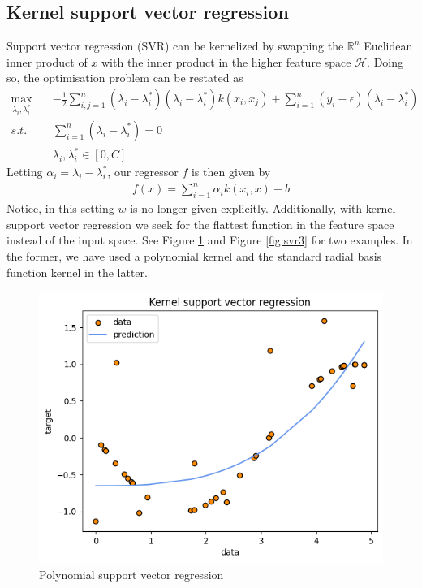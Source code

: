 \subsection{Kernel support vector regression}
Support vector regression (SVR) can be kernelized by swapping the $\mathbb{R}^n$ Euclidean inner product of $x$ with the inner product in the higher feature space $\mathcal{H}$. Doing so, the optimisation problem can be restated as
\begin{equation}
    \begin{aligned}
        \max_{\lambda_i, \lambda_i^*} \quad& -\frac{1}{2}\sum\limits_{i,j=1}^n(\lambda_i-\lambda_i^*)(\lambda_i-\lambda_i^*)k(x_i, x_j)+\sum\limits_{i=1}^n(y_i-\epsilon)(\lambda_i-\lambda_i^*)
        \\
        s.t. \quad& \sum\limits_{i=1}^n(\lambda_i-\lambda_i^*)=0
        \\
        \quad& \lambda_i, \lambda_i^* \in [0,C]
    \end{aligned}
\end{equation}
Letting $\alpha_i=\lambda_i - \lambda_i^*$, our regressor $f$ is then given by
\begin{equation}
    \begin{aligned}
        f(x)=\sum\limits_{i=1}^n \alpha_i k(x_i, x)+b
    \end{aligned}
\end{equation}
Notice, in this setting $w$ is no longer given explicitly. Additionally, with kernel support vector regression we seek for the flattest function in the feature space instead of the input space.
See Figure \ref{fig:svr2} and Figure \ref{fig:svr3} for two examples. In the former, we have used a polynomial kernel and the standard radial basis function kernel in the latter.
\begin{figure}
    \includegraphics[width=\textwidth]{images/svr2.png}
    \caption{Polynomial support vector regression}
    \label{fig:svr2}
\end{figure}
